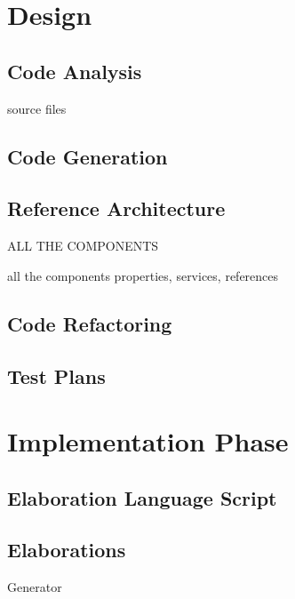 \documentclass{report}
\begin{document}
\chapter{Design}

	\section{Code Analysis}
	
	\par source files
	
	\section{Code Generation}
	
	\section{Reference Architecture}
	
	\par ALL THE COMPONENTS
	\par all the components properties, services, references
	
	\section{Code Refactoring}
	

	
	\section{Test Plans}
	

\chapter{Implementation Phase}

	\section{Elaboration Language Script}
	
	\section{Elaborations}
	
	\par Generator
	
\end{document}
